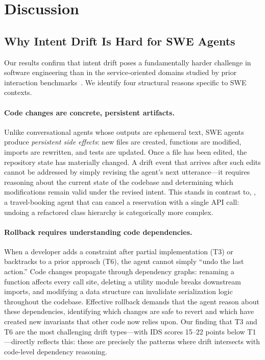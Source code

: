 
\section{Discussion}
\label{sec:discussion}

\subsection{Why Intent Drift Is Hard for SWE Agents}
\label{sec:disc-hard-swe}

Our results confirm that intent drift poses a fundamentally harder challenge in software engineering than in the service-oriented domains studied by prior interaction benchmarks~\citep{yao2024taubench, tauknowledge2026}. We identify four structural reasons specific to SWE contexts.

\paragraph{Code changes are concrete, persistent artifacts.}
Unlike conversational agents whose outputs are ephemeral text, SWE agents produce \emph{persistent side effects}: new files are created, functions are modified, imports are rewritten, and tests are updated. Once a file has been edited, the repository state has materially changed. A drift event that arrives after such edits cannot be addressed by simply revising the agent's next utterance---it requires reasoning about the current state of the codebase and determining which modifications remain valid under the revised intent. This stands in contrast to, \eg, a travel-booking agent that can cancel a reservation with a single API call: undoing a refactored class hierarchy is categorically more complex.

\paragraph{Rollback requires understanding code dependencies.}
When a developer adds a constraint after partial implementation (T3) or backtracks to a prior approach (T6), the agent cannot simply ``undo the last action.'' Code changes propagate through dependency graphs: renaming a function affects every call site, deleting a utility module breaks downstream imports, and modifying a data structure can invalidate serialization logic throughout the codebase. Effective rollback demands that the agent reason about these dependencies, identifying which changes are safe to revert and which have created new invariants that other code now relies upon. Our finding that T3 and T6 are the most challenging drift types---with IDS scores 15--22 points below T1---directly reflects this: these are precisely the patterns where drift intersects with code-level dependency reasoning.

